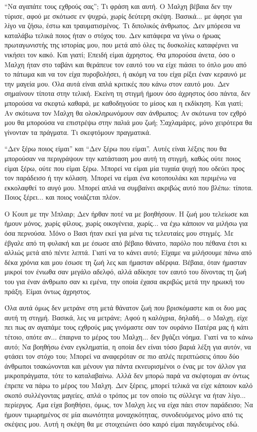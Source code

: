 \documentclass[12pt,twoside, openany]{book}
\begin{document}
“Να αγαπάτε τους εχθρούς σας”; Τι φράση και αυτή. Ο Μαλχη βέβαια δεν την τύρισε, αφού με σκότωσε εν ψυχρώ, χωρίς δεύτερη σκέψη. Βασικά... με άφησε για λίγο να ζήσω, έστω και τραυματισμένος. Τι διπολικός άνθρωπος. Δεν μπόρεσα να καταλάβω τελικά ποιος ήταν ο στόχος του. Δεν κατάφερα να γίνω ο ήρωας πρωταγωνιστής της ιστορίας μου, που μετά από όλες τις δυσκολίες καταφέρνει να νικήσει τον κακό. Και γιατί; Επειδή είμαι άχρηστος. Θα μπορούσα άνετα, όσο ο Μαλχη ήταν στο ταβάνι και θεράπευε τον εαυτό του να είχε πιάσει το όπλο μου από το πάτωμα και να τον είχα πυροβολήσει, ή ακόμη να του είχα ρίξει έναν κεραυνό με την μαγεία μου. Όλα αυτά είναι απλά κριτικές που κάνω στον εαυτό μου. Δεν σημαίνουν τίποτα στην τελική. Εκείνη τη στιγμή ήμουν όσο άχρηστος όσο πάντα, δεν μπορούσα να σκεφτώ καθαρά, με καθοδηγούσε το μίσος και η εκδίκηση. Και γιατί; Αν σκότωνα τον Μαλχη θα ολοκληρωνόμουν σαν άνθρωπος; Αν σκότωνα τον εχθρό μου θα μπορούσα να επιστρέψω στην παλιά μου ζωή; Σαχλαμάρες, μόνο χειρότερα θα γίνονταν τα πράγματα. Τι σκεφτόμουν πραγματικά.

“Δεν ξέρω ποιος είμαι” και “Δεν ξέρω που είμαι”. Αυτές είναι λέξεις που θα μπορούσαν να περιγράψουν την κατάσταση μου αυτή τη στιγμή, καθώς ούτε ποιος είμαι ξέρω, ούτε που είμαι ξέρω. Μπορεί να είμαι μία τυχαία ψυχή που οδεύει προς τον παράδεισο ή την κόλαση. Μπορεί να είμαι ένα κοτοπουλάκι και περιμένω να εκκολαφθεί το αυγό μου. Μπορεί απλά να συμβαίνει ακριβώς αυτό που βλέπω: τίποτα. Ποιος ξέρει... και ποιος νοιάζεται πλέον.

Ο Κουπ με την Μπλαιρ; Δεν ήρθαν ποτέ να με βοηθήσουν. Η ζωή μου τελείωσε και ήμουν μόνος, χωρίς φίλους, χωρίς οικογένεια, χωρίς... να έχω κάποιον να μιλήσω για όσα περνούσα. Μόνο ο Βασι ήταν εκεί για μένα τις τελευταίες μου στιγμές. Με έβγαλε από τη φυλακή και με έσωσε από βέβαιο θάνατο, παρόλο που πέθανα έτσι κι αλλιώς μετά από πέντε λεπτά. Γιατί να το κάνει αυτό; Είχαμε να μιλήσουμε πάνω από δέκα χρόνια και μου έσωσε τη ζωή λες και ήμασταν αδέρφια. Βέβαια, όταν ήμασταν μικροί τον ένιωθα σαν μεγάλο αδελφό, αλλά αδίκησε τον εαυτό του δίνοντας τη ζωή του για έναν άνθρωπο σαν κι εμένα, την οποία έχασα ακριβώς μετά την ηρωική του πράξη. Είμαι όντως άχρηστος.

Όλα αυτά όμως δεν μετράνε στη μετά θάνατον ζωή που βρισκόμαστε και οι δυο μας αυτή τη στιγμή. Βασικά, λες να μετράνε; Αφού η καλόγρια, δηλαδή... ο Μαλχη, είχε πει πως αν αγαπάμε τους εχθρούς μας γινόμαστε σαν τον ουράνιο Πατέρα μας ή κάτι τέτοιο, οπότε αν... έπαιρνα το μέρος του Μαλχη... δεν βγάζει νόημα. Γιατί να το κάνω αυτό; Να βοηθήσω έναν εγκληματία, η οποία δεν είναι τόσο βαριά λέξη για αυτόν, να φτάσει τον στόχο του; Μπορεί να αναφερόταν σε πιο απλές περιπτώσεις όπου δύο άνθρωποι τσακώνονται και μένουν για πάντα εκνευρισμένοι ο ένας με τον άλλον για μικροπράγματα, τότε το καταλαβαίνω. Αλλά δεν μπορώ παρά να σκέφτομαι αν όντως έπρεπε να πάρω το μέρος του Μαλχη. Δεν ξέρεις, μπορεί τελικά να είχε κάποιον καλό σκοπό συλλέγοντας μαγείες, απλά ο τρόπος με τον οποίο τις σύλλεγε να ήταν λίγο... περίεργος. Άμα είχα βοηθήσει, όμως, τον Μαλχη λες να είχα πάει στον παράδεισο; Να ήμουν τιμωρημένος σε μία αιωνιότητα μοναχικότητας, συνοδευόμενος μόνο από τις σκέψεις μου. Αυτή η σκέψη θα με στοιχειώνει όσο καιρό είμαι παγιδευμένος εδώ.
\end{document}
